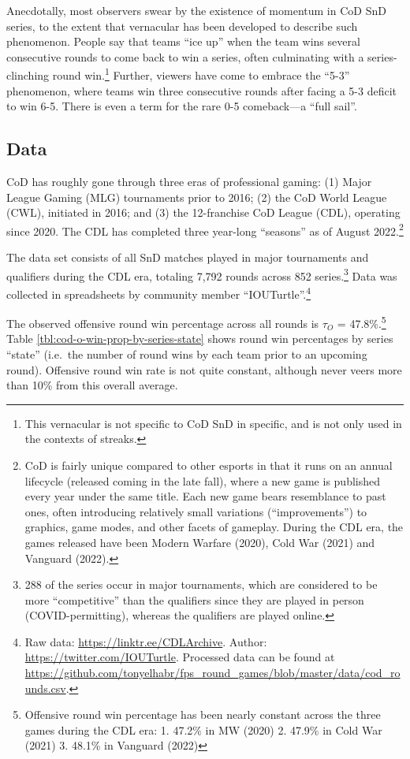\documentclass{article}
\begin{document}
Anecdotally, most observers swear by the existence of momentum in CoD
SnD series, to the extent that vernacular has been developed to describe
such phenomenon. People say that teams ``ice up'' when the team wins
several consecutive rounds to come back to win a series, often
culminating with a series-clinching round win.\footnote{This vernacular
  is not specific to CoD SnD in specific, and is not only used in the
  contexts of streaks.} Further, viewers have come to embrace the
``5-3'' phenomenon, where teams win three consecutive rounds after
facing a 5-3 deficit to win 6-5. There is even a term for the rare 0-5
comeback---a ``full sail''.

\hypertarget{data}{%
\subsection{Data}\label{data}}

CoD has roughly gone through three eras of professional gaming: (1)
Major League Gaming (MLG) tournaments prior to 2016; (2) the CoD World
League (CWL), initiated in 2016; and (3) the 12-franchise CoD League
(CDL), operating since 2020. The CDL has completed three year-long
``seasons'' as of August 2022.\footnote{CoD is fairly unique compared to
  other esports in that it runs on an annual lifecycle (released coming
  in the late fall), where a new game is published every year under the
  same title. Each new game bears resemblance to past ones, often
  introducing relatively small variations (``improvements'') to
  graphics, game modes, and other facets of gameplay. During the CDL
  era, the games released have been Modern Warfare (2020), Cold War
  (2021) and Vanguard (2022).}

The data set consists of all SnD matches played in major tournaments and
qualifiers during the CDL era, totaling 7,792 rounds across 852
series.\footnote{288 of the series occur in major tournaments, which are
  considered to be more ``competitive'' than the qualifiers since they
  are played in person (COVID-permitting), whereas the qualifiers are
  played online.} Data was collected in spreadsheets by community member
``IOUTurtle''.\footnote{Raw data: \url{https://linktr.ee/CDLArchive}.
  Author: \url{https://twitter.com/IOUTurtle}. Processed data can be
  found at
  \url{https://github.com/tonyelhabr/fps_round_games/blob/master/data/cod_rounds.csv}.}

The observed offensive round win percentage across all rounds is
\(\tau_O\) = 47.8\%.\footnote{Offensive round win percentage has been
  nearly constant across the three games during the CDL era: 1. 47.2\%
  in MW (2020) 2. 47.9\% in Cold War (2021) 3. 48.1\% in Vanguard (2022)}
Table \ref{tbl:cod-o-win-prop-by-series-state} shows round win
percentages by series ``state'' (i.e.~the number of round wins by each
team prior to an upcoming round). Offensive round win rate is not quite
constant, although never veers more than 10\% from this overall average.
\end{document}
